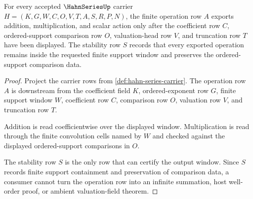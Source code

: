 \begin{theorem}
\label{thm:hahn-series-finite-window-operations}
For every accepted $\HahnSeriesUp$ carrier $H=(K,G,W,C,O,V,T,A,S,R,P,N)$, the finite operation row $A$ exports addition, multiplication, and scalar action only after the coefficient row $C$, ordered-support comparison row $O$, valuation-head row $V$, and truncation row $T$ have been displayed. The stability row $S$ records that every exported operation remains inside the requested finite support window and preserves the ordered-support comparison data.
\end{theorem}
\begin{proof}
Project the carrier rows from \autoref{def:hahn-series-carrier}. The operation row $A$ is downstream from the coefficient field $K$, ordered-exponent row $G$, finite support window $W$, coefficient row $C$, comparison row $O$, valuation row $V$, and truncation row $T$.

Addition is read coefficientwise over the displayed window. Multiplication is read through the finite convolution cells named by $W$ and checked against the displayed ordered-support comparisons in $O$.

The stability row $S$ is the only row that can certify the output window. Since $S$ records finite support containment and preservation of comparison data, a consumer cannot turn the operation row into an infinite summation, host well-order proof, or ambient valuation-field theorem.
\end{proof}

